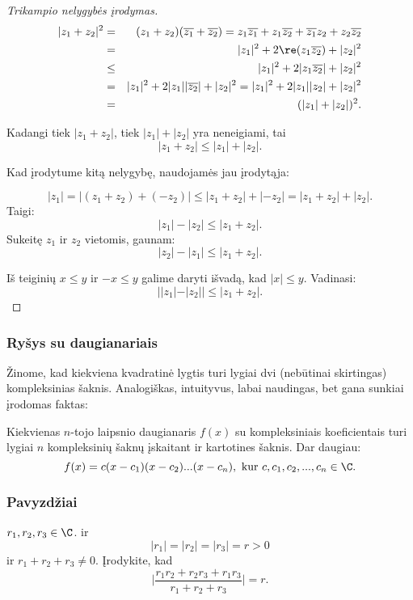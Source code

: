 \begin{proof}[Trikampio nelygybės įrodymas]
\begin{eqnarray*}
|z_1+z_2|^2&=&(z_1+z_2)(\overline{z_1}+\overline{z_2})=z_1\overline{z_1}+z_1\overline{z_2}+\overline{z_1}z_2+z_2\overline{z_2} \\
&=& |z_1|^2+2\re(z_1\overline{z_2})+|z_2|^2\\
&\leq & |z_1|^2+2|z_1\overline{z_2}|+|z_2|^2\\
&=& |z_1|^2+2|z_1||\overline{z_2}|+|z_2|^2 = |z_1|^2+2|z_1||z_2|+|z_2|^2 \\
&=& (|z_1|+|z_2|)^2.
\end{eqnarray*}

Kadangi tiek $|z_1+z_2|$, tiek $|z_1|+|z_2|$ yra neneigiami, tai $$|z_1+z_2|\leq |z_1|+|z_2|.$$

Kad įrodytume kitą nelygybę, naudojamės jau įrodytąja:

$$|z_1|=|(z_1+z_2)+(-z_2)|\leq |z_1+z_2|+|-z_2|=|z_1+z_2|+|z_2|.$$ Taigi: $$|z_1|-|z_2|\leq |z_1+z_2|.$$ Sukeitę $z_1$ ir $z_2$ vietomis, gaunam: $$|z_2|-|z_1|\leq |z_1+z_2|.$$

Iš teiginių $x\leq y$ ir $-x\leq y$ galime daryti išvadą, kad $|x|\leq y$. Vadinasi: $$||z_1|-|z_2||\leq |z_1+z_2|.$$

\end{proof}

\subsubsection{Ryšys su daugianariais}

Žinome, kad kiekviena kvadratinė lygtis turi lygiai dvi (nebūtinai skirtingas) kompleksinias šaknis. Analogiškas, intuityvus, labai naudingas, bet gana sunkiai įrodomas faktas: 

\begin{thm} Kiekvienas $n$-tojo laipsnio daugianaris $f(x)$ su kompleksiniais koeficientais turi lygiai $n$ kompleksinių šaknų įskaitant ir kartotines šaknis. Dar daugiau: 
$$f(x)=c(x-c_1)(x-c_2)...(x-c_n),\text{ kur }c,c_1,c_2,...,c_n\in\C.$$\end{thm}

\subsubsection{Pavyzdžiai}

\begin{pavnr}
$r_1,r_2,r_3\in\C$. ir $$|r_1|=|r_2|=|r_3|=r>0$$ ir $r_1+r_2+r_3\neq 0$. Įrodykite, kad $$\Bigg\vert\frac{r_1r_2+r_2r_3+r_1r_3}{r_1+r_2+r_3}\Bigg\vert=r.$$  
\end{pavnr}

